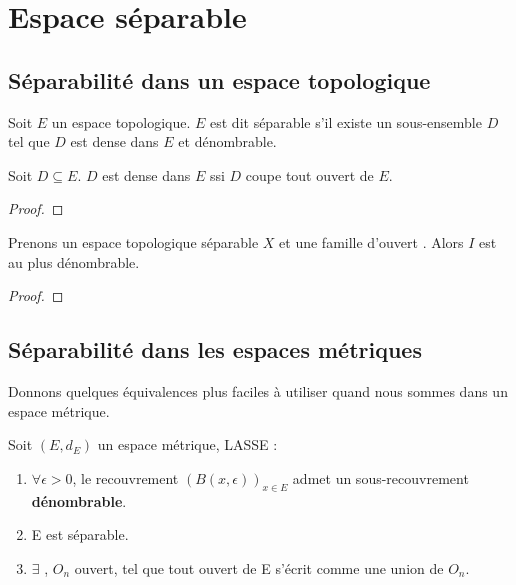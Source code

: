 \chapter{Espace séparable}

\section{Séparabilité dans un espace topologique}

\begin{definition}
	Soit $E$ un espace topologique.
	$E$ est dit séparable s'il existe un sous-ensemble $D$ tel que $D$ est dense
	dans $E$ et dénombrable.
\end{definition}

\begin{proposition}
	Soit $D \subseteq E$.
	$D$ est dense dans $E$ ssi $D$ coupe tout ouvert de $E$.
\end{proposition}

\begin{proof}

\end{proof}

\begin{proposition}
	Prenons un espace topologique séparable $X$ et une famille d'ouvert
	. Alors $I$ est au plus dénombrable.
\end{proposition}

\begin{proof}
	
\end{proof}

\section{Séparabilité dans les espaces métriques}

Donnons quelques équivalences plus faciles à utiliser quand nous sommes dans un
espace métrique.

\begin{proposition}
	Soit $(E, d_{E})$ un espace métrique, LASSE :
	\begin{enumerate}
		\item $\forall \epsilon > 0$, le recouvrement $(B(x, \epsilon))_{x \in
			E}$ admet un sous-recouvrement \textbf{dénombrable}.
		\item E est séparable.
		\item $\exists$ , $O_{n}$ ouvert, tel que
			tout ouvert de E s'écrit comme une union de $O_{n}$.
	\end{enumerate}
\end{proposition}


